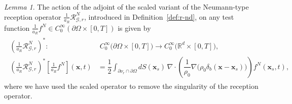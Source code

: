 \documentclass[11pt,reqno]{amsart}
\theoremstyle{remark}
\theoremstyle{italic_lemma}
\newtheorem{lemma}{Lemma}
\newcommand{\bx}{\boldsymbol{x}}
\begin{document}
\begin{lemma}   \label{lemma:rt-n}
The action of the adjoint of the scaled variant of the Neumann-type reception operator \( \frac{1}{a_R}\mathcal{R}_{\mathcal{G},r}^N \), introduced in Definition~\eqref{def:r-nd}, on any test function \( \frac{1}{a_R} f^N \in C_0^{\infty}\!\left(\partial \Omega \times [0,T]\right) \) is given by
\begin{align}       \label{eq:meas-adj}
    \begin{split}
    \left(  \frac{1}{a_R} \mathcal{R}_{\mathcal{G},r}^N \right)^* \!:&\;  C_0^{\infty} \big(\partial \Omega \times [0, T] \big) \rightarrow C_0^{\infty} \big(\mathbb{R}^d \times [0,T] \big),\\
     \left(  \frac{1}{a_R} \mathcal{R}_{\mathcal{G},r}^N \right)^*[\frac{1}{a_R} f^N](\bx, t) &= 
\dfrac{1}{2} \displaystyle\int_{\partial \nu_r \cap \partial \Omega} d S(\bx_s)\,  \nabla \cdot \left( \dfrac{1}{\rho_0} \nabla \Big( \rho_0 \delta_b(\bx - \bx_s) \Big) \right) f^N(\bx_s, t), 
    \end{split}
\end{align}
where we have used the scaled operator to remove the singularity of the reception operator.


\end{lemma}
\end{document}
